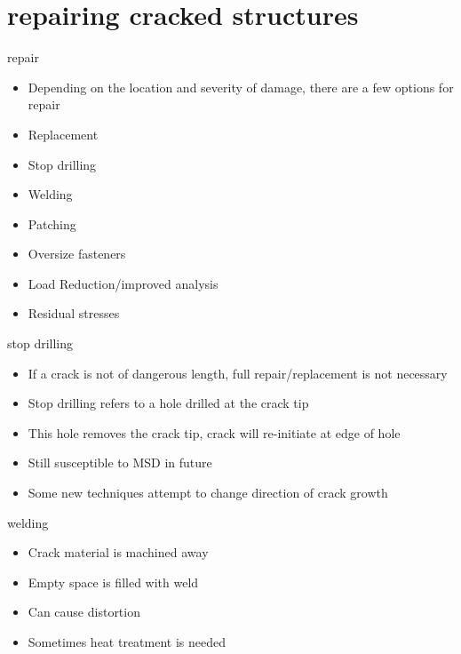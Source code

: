 \documentclass[10pt]{beamer}
\begin{document}
	\section{repairing cracked structures}
	
	\begin{frame}{repair}
		\begin{itemize}[<+->]
			\item Depending on the location and severity of damage, there are a few options for repair
			\item Replacement
			\item Stop drilling
			\item Welding
			\item Patching
			\item Oversize fasteners
			\item Load Reduction/improved analysis
			\item Residual stresses
		\end{itemize}
	\end{frame}
	
	\begin{frame}{stop drilling}
		\begin{itemize}[<+->]
			\item If a crack is not of dangerous length, full repair/replacement is not necessary
			\item Stop drilling refers to a hole drilled at the crack tip
			\item This hole removes the crack tip, crack will re-initiate at edge of hole
			\item Still susceptible to MSD in future
			\item Some new techniques attempt to change direction of crack growth
		\end{itemize}
	\end{frame}
	
	\begin{frame}{welding}
		\begin{itemize}[<+->]
			\item Crack material is machined away
			\item Empty space is filled with weld
			\item Can cause distortion
			\item Sometimes heat treatment is needed
		\end{itemize}
	\end{frame}
	
\end{document}
